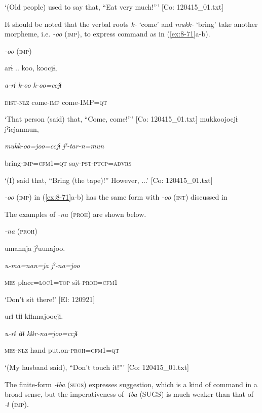 \glt ‘(Old people) used to say that, “Eat very much!”’ [Co: 120415\_01.txt]
\z

It should be noted that the verbal roots \textit{k-} ‘come’ and \textit{mukk-} ‘bring’ take another morpheme, i.e. \textit{{}-oo} (\textsc{imp}), to express command as in (\ref{ex:8-71}a-b).

\ea\label{ex:8-71}
  \textit{{}-oo} (\textsc{imp})

\ea {\TM}
\glll  arɨ ..  koo,  koocjɨ,

      \textit{a-rɨ}  \textit{k-oo}  \textit{k-oo=ccjɨ}

      \textsc{dist}-\textsc{nlz}  come-\textsc{imp}  come-IMP=\textsc{qt}

\glt ‘That person (said) that, “Come, come!”’ [Co: 120415\_01.txt]
\ex {\TM}
\glll  mukkoojocjɨ  jˀicjanmun,

      \textit{mukk-oo=joo=ccjɨ}  \textit{jˀ-tar-n=mun}

      bring-\textsc{imp}=\textsc{cfm1}=\textsc{qt}  say-\textsc{pst}-\textsc{ptcp}=\textsc{advrs}

\glt ‘(I) said that, “Bring (the tape)!” However, ...’ [Co: 120415\_01.txt]
\z

\textit{{}-oo} (\textsc{imp}) in (\ref{ex:8-71}a-b) has the same form with \textit{-oo} (\textsc{int}) discussed in 

  The examples of \textit{{}-na} (\textsc{proh}) are shown below.

\ea\label{ex:8-72}
  \textit{{}-na} (\textsc{proh})

\ea {\TM}
\glll  umannja  jˀuunajoo.

      \textit{u-ma=nan=ja}  \textit{jˀ-na=joo}

      \textsc{mes}-place=\textsc{loc}1=\textsc{top}  sit-\textsc{proh}=\textsc{cfm1}

\glt ‘Don’t sit there!’ [El: 120921]

\ex {\TM}
\glll  urɨ  tɨɨ  kɨɨnnajoocjɨ.

      \textit{u-rɨ}  \textit{tɨɨ}  \textit{kɨɨr-na=joo=ccjɨ}

      \textsc{mes}-\textsc{nlz}  hand  put.on-\textsc{proh}=\textsc{cfm1}=\textsc{qt}

\glt ‘(My husband said), “Don’t touch it!”’ [Co: 120415\_01.txt]
\z

  The finite-form \textit{{}-ɨba} (\textsc{sugs}) expresses suggestion, which is a kind of command in a broad sense, but the imperativeness of \textit{{}-ɨba} (SUGS) is much weaker than that of \textit{{}-ɨ} (\textsc{imp}).

